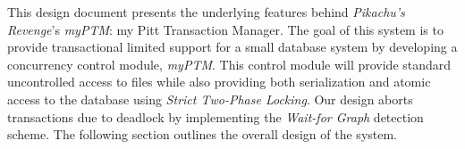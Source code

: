 This design document presents the underlying features behind \textit{Pikachu's Revenge}'s \textit{myPTM}: my Pitt Transaction Manager. The goal of this system is to provide transactional limited support for a small database system by developing a concurrency control module, \textit{myPTM}. This control module will provide standard uncontrolled access to files while also providing both serialization and atomic access to the database using \textit{Strict Two-Phase Locking}. Our design aborts transactions due to deadlock by implementing the \textit{Wait-for Graph} detection scheme. The following section outlines the overall design of the system.